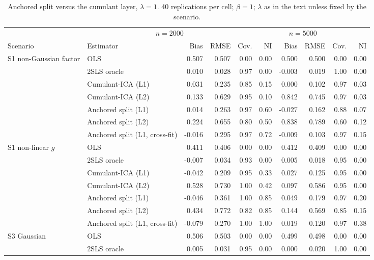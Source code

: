 \begin{table}[p]
\centering
\scriptsize
\setlength{\tabcolsep}{2.5pt}
\caption{Anchored split versus the cumulant layer, $\lambda=1$.  40 replications per cell; $\beta=1$; $\lambda$ as in the text unless fixed by the scenario.}\label{tab:mc-anchored}
\begin{tabular}{@{}llrrrrrrrr@{}}
\toprule
 & \multicolumn{4}{c}{$n=2000$} & \multicolumn{4}{c}{$n=5000$} \\
\cmidrule(lr){3-6} \cmidrule(lr){7-10}
Scenario & Estimator & Bias & RMSE & Cov. & NI & Bias & RMSE & Cov. & NI \\
\midrule
S1 non-Gaussian factor & OLS & 0.507 & 0.507 & 0.00 & 0.00 & 0.500 & 0.500 & 0.00 & 0.00 \\
 & 2SLS oracle & 0.010 & 0.028 & 0.97 & 0.00 & -0.003 & 0.019 & 1.00 & 0.00 \\
 & Cumulant-ICA (L1) & 0.031 & 0.235 & 0.85 & 0.15 & 0.000 & 0.102 & 0.97 & 0.03 \\
 & Cumulant-ICA (L2) & 0.133 & 0.629 & 0.95 & 0.10 & 0.842 & 0.745 & 0.97 & 0.03 \\
 & Anchored split (L1) & 0.014 & 0.263 & 0.97 & 0.60 & -0.027 & 0.162 & 0.88 & 0.07 \\
 & Anchored split (L2) & 0.224 & 0.655 & 0.80 & 0.50 & 0.838 & 0.789 & 0.60 & 0.12 \\
 & Anchored split (L1, cross-fit) & -0.016 & 0.295 & 0.97 & 0.72 & -0.009 & 0.103 & 0.97 & 0.15 \\
\addlinespace
S1 non-linear $g$ & OLS & 0.411 & 0.406 & 0.00 & 0.00 & 0.412 & 0.409 & 0.00 & 0.00 \\
 & 2SLS oracle & -0.007 & 0.034 & 0.93 & 0.00 & 0.005 & 0.018 & 0.95 & 0.00 \\
 & Cumulant-ICA (L1) & -0.042 & 0.209 & 0.95 & 0.33 & 0.027 & 0.125 & 0.95 & 0.00 \\
 & Cumulant-ICA (L2) & 0.528 & 0.730 & 1.00 & 0.42 & 0.097 & 0.586 & 0.95 & 0.00 \\
 & Anchored split (L1) & -0.046 & 0.361 & 1.00 & 0.85 & 0.049 & 0.179 & 0.97 & 0.20 \\
 & Anchored split (L2) & 0.434 & 0.772 & 0.82 & 0.85 & 0.144 & 0.569 & 0.85 & 0.15 \\
 & Anchored split (L1, cross-fit) & -0.079 & 0.270 & 1.00 & 1.00 & 0.019 & 0.120 & 0.97 & 0.38 \\
\addlinespace
S3 Gaussian & OLS & 0.506 & 0.503 & 0.00 & 0.00 & 0.499 & 0.498 & 0.00 & 0.00 \\
 & 2SLS oracle & 0.005 & 0.031 & 0.95 & 0.00 & 0.000 & 0.020 & 1.00 & 0.00 \\

\end{tabular}
\end{table}
